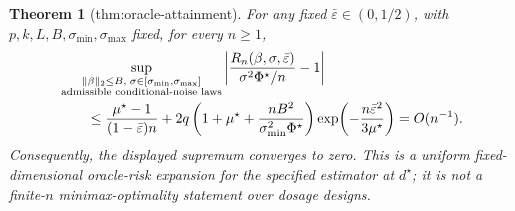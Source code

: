 \documentclass{article}
\newtheorem{theorem}{Theorem}
\begin{document}
\begin{theorem}[thm:oracle-attainment]\label{thm:oracle-attainment}
For any fixed \(\bar\varepsilon\in(0,1/2)\), with \(p,k,L,B,\sigma_{\min},\sigma_{\max}\) fixed, for every \(n\ge1\),
\[
\begin{aligned}
 &\sup_{\substack{\|\beta\|_2\le B,\;\sigma\in[\sigma_{\min},\sigma_{\max}]\\
 \textnormal{admissible conditional-noise laws}}}
 \left|
 \frac{R_n(\beta,\sigma,\bar\varepsilon)}{\sigma^2\Phi^\star/n}-1
 \right|\\
 &\qquad\le
 \frac{\mu^\star-1}{(1-\bar\varepsilon)n}
 +2q\left(1+\mu^\star+
 \frac{nB^2}{\sigma_{\min}^2\Phi^\star}\right)
 \exp\!\left(-\frac{n\bar\varepsilon^2}{3\mu^\star}\right)
 =O(n^{-1}).
\end{aligned}
\]
Consequently, the displayed supremum converges to zero. This is a uniform fixed-dimensional oracle-risk expansion for the specified estimator at \(d^\star\); it is not a finite-\(n\) minimax-optimality statement over dosage designs.
\end{theorem}
\end{document}
